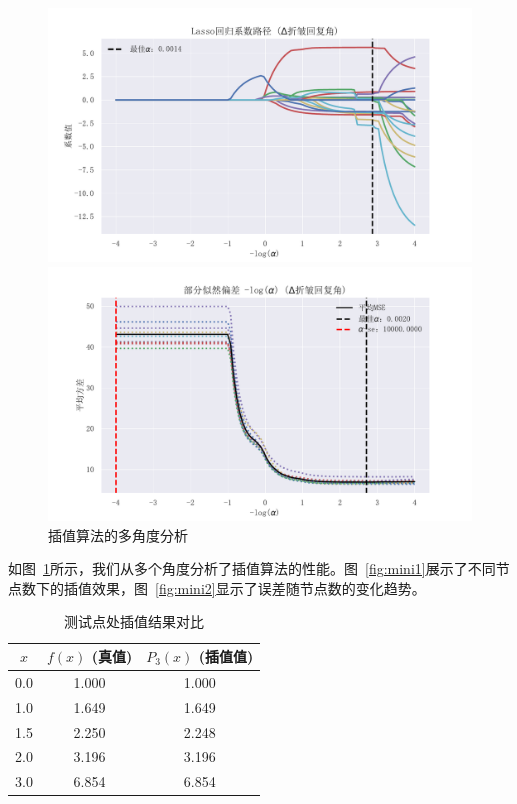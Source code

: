 \documentclass{joulabreport}
\begin{document}
{\begin{figure}[htbp]
    \centering
    \begin{minipage}[t]{0.45\textwidth}
        \centering
        \includegraphics[width=\textwidth]{figure/minipage1.pdf}
    \end{minipage}
    \hfill
    \begin{minipage}[t]{0.45\textwidth}
        \centering
        \includegraphics[width=\textwidth]{figure/minipage2.pdf}
    \end{minipage}
    \caption{插值算法的多角度分析}
    \label{fig:analysis}
\end{figure}

如图~\ref{fig:analysis}所示，我们从多个角度分析了插值算法的性能。图~\ref{fig:mini1}展示了不同节点数下的插值效果，图~\ref{fig:mini2}显示了误差随节点数的变化趋势。

\begin{table}[htbp]
\centering
\caption{测试点处插值结果对比}
\label{tab:comparison}
\begin{tabular}{ccc}
\toprule[1.5pt]
$x$ & $f(x)$ (真值) & $P_3(x)$ (插值值) \\
\midrule[0.75pt]
0.0 & 1.000 & 1.000 \\
1.0 & 1.649 & 1.649 \\
1.5 & 2.250 & 2.248 \\
2.0 & 3.196 & 3.196 \\
3.0 & 6.854 & 6.854 \\
\bottomrule[1.5pt]
\end{tabular}
\end{table}

}
\end{document}
